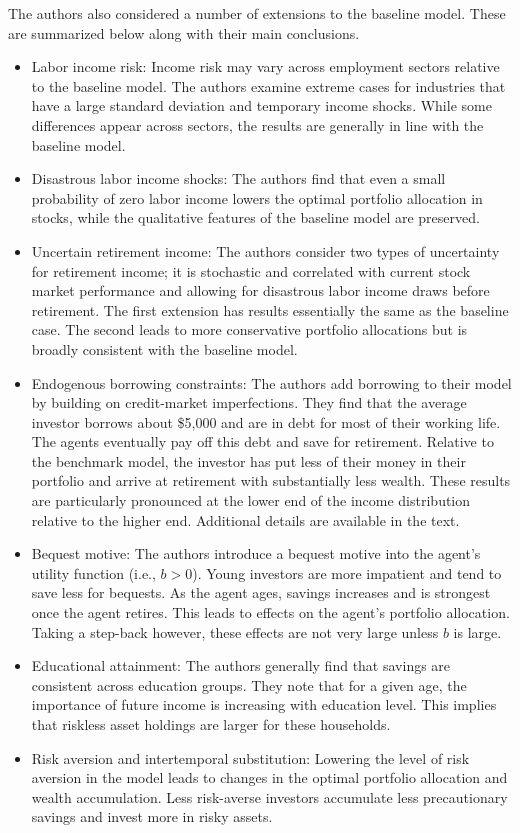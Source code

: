 \documentclass[./CGMPortfolio.tex]{subfiles}
\begin{document}
The authors also considered a number of extensions to the baseline model. These are summarized below along with their main conclusions.
\begin{itemize}
	\item Labor income risk: Income risk may vary across employment sectors relative to the baseline model. The authors examine extreme cases for industries that have a large standard deviation and temporary income shocks. While some differences appear across sectors, the results are generally in line with the baseline model.
	\item Disastrous labor income shocks: The authors find that even a small probability of zero labor income lowers the optimal portfolio allocation in stocks, while the qualitative features of the baseline model are preserved.
	\item Uncertain retirement income: The authors consider two types of uncertainty for retirement income; it is stochastic and correlated with current stock market performance and allowing for disastrous labor income draws before retirement. The first extension has results essentially the same as the baseline case. The second leads to more conservative portfolio allocations but is broadly consistent with the baseline model.
	\item Endogenous borrowing constraints: The authors add borrowing to their model by building on credit-market imperfections. They find that the average investor borrows about \$5,000 and are in debt for most of their working life. The agents eventually pay off this debt and save for retirement. Relative to the benchmark model, the investor has put less of their money in their portfolio and arrive at retirement with substantially less wealth. These results are particularly pronounced at the lower end of the income distribution relative to the higher end. Additional details are available in the text.
	\item Bequest motive: The authors introduce a bequest motive into the agent's utility function (i.e., $b>0$). Young investors are more impatient and tend to save less for bequests. As the agent ages, savings increases and is strongest once the agent retires. This leads to effects on the agent's portfolio allocation. Taking a step-back however, these effects are not very large unless $b$ is large.
	\item Educational attainment: The authors generally find that savings are consistent across education groups. They note that for a given age, the importance of future income is increasing with education level. This implies that riskless asset holdings are larger for these households.
	\item Risk aversion and intertemporal substitution: Lowering the level of risk aversion in the model leads to changes in the optimal portfolio allocation and wealth accumulation. Less risk-averse investors accumulate less precautionary savings and invest more in risky assets.
\end{itemize}
\end{document}
